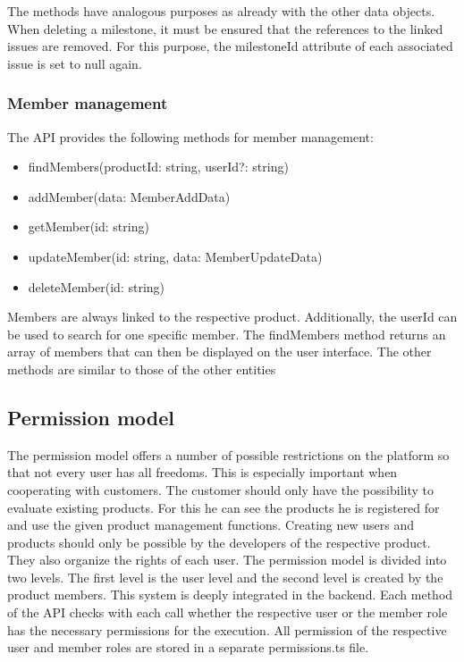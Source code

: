     The methods have analogous purposes as already with the other data objects. When deleting a milestone, it must be ensured that the references to the linked issues are removed. For this purpose, the milestoneId attribute of each associated issue is set to null again.

    \subsubsection*{Member management}
    The API provides the following methods for member management:

    \begin{itemize}
        \item findMembers(productId: string, userId?: string)
        \item addMember(data: MemberAddData)
        \item getMember(id: string)
        \item updateMember(id: string, data: MemberUpdateData)
        \item deleteMember(id: string)
    \end{itemize}

    Members are always linked to the respective product. Additionally, the userId can be used to search for one specific member. The findMembers method returns an array of members that can then be displayed on the user interface.
    The other methods are similar to those of the other entities

    \subsection*{Permission model}
    The permission model offers a number of possible restrictions on the platform so that not every user has all freedoms. This is especially important when cooperating with customers. The customer should only have the possibility to evaluate existing products. For this he can see the products he is registered for and use the given product management functions. Creating new users and products should only be possible by the developers of the respective product. They also organize the rights of each user. The permission model is divided into two levels. The first level is the user level and the second level is created by the product members. This system is deeply integrated in the backend. Each method of the API checks with each call whether the respective user or the member role has the necessary permissions for the execution. All permission of the respective user and member roles are stored in a separate permissions.ts file. 

